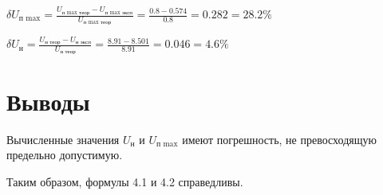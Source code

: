$\delta U_\text{п max} = \frac{U_\text{п max\ \ теор} - U_\text{п max\ \ эксп}}{U_\text{п max\ \ теор}} = \frac{0.8 - 0.574}{0.8} = 0.282 = 28.2 \%$

$\delta U_\text{н} = \frac{U_\text{н\ \ теор} - U_\text{н\ \ эксп}}{U_\text{н\ \ теор}} = \frac{8.91 - 8.501}{8.91} = 0.046 = 4.6 \%$

\section{Выводы}

Вычисленные значения $U_\text{н}$ и $U_\text{п max}$ имеют погрешность, не превосходящую предельно допустимую.

Таким образом, формулы 4.1 и 4.2 справедливы.


